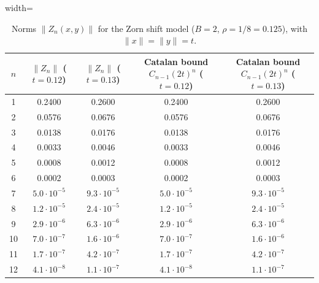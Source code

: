 \documentclass[11pt]{amsart}
\numberwithin{equation}{section}
\theoremstyle{remark}
\begin{document}
\begin{table}[h!]
\centering
\caption{Norms $\|Z_n(x,y)\|$ for the Zorn shift model ($B = 2$, $\rho = 1/8 = 0.125$), with $\|x\| = \|y\| = t$.}
\label{tab:zorn-numerics}
\begin{adjustbox}{width=\textwidth}
\begin{tabular}{c c c c c}
\toprule
$n$ & $\|Z_n\|$ ($t=0.12$) & $\|Z_n\|$ ($t=0.13$) & Catalan bound $C_{n-1}(2t)^n$ ($t=0.12$) & Catalan bound $C_{n-1}(2t)^n$ ($t=0.13$) \\
\midrule
1 & 0.2400 & 0.2600 & 0.2400 & 0.2600 \\
2 & 0.0576 & 0.0676 & 0.0576 & 0.0676 \\
3 & 0.0138 & 0.0176 & 0.0138 & 0.0176 \\
4 & 0.0033 & 0.0046 & 0.0033 & 0.0046 \\
5 & 0.0008 & 0.0012 & 0.0008 & 0.0012 \\
6 & 0.0002 & 0.0003 & 0.0002 & 0.0003 \\
7 & $5.0\cdot10^{-5}$ & $9.3\cdot10^{-5}$ & $5.0\cdot10^{-5}$ & $9.3\cdot10^{-5}$ \\
8 & $1.2\cdot10^{-5}$ & $2.4\cdot10^{-5}$ & $1.2\cdot10^{-5}$ & $2.4\cdot10^{-5}$ \\
9 & $2.9\cdot10^{-6}$ & $6.3\cdot10^{-6}$ & $2.9\cdot10^{-6}$ & $6.3\cdot10^{-6}$ \\
10& $7.0\cdot10^{-7}$ & $1.6\cdot10^{-6}$ & $7.0\cdot10^{-7}$ & $1.6\cdot10^{-6}$ \\
11& $1.7\cdot10^{-7}$ & $4.2\cdot10^{-7}$ & $1.7\cdot10^{-7}$ & $4.2\cdot10^{-7}$ \\
12& $4.1\cdot10^{-8}$ & $1.1\cdot10^{-7}$ & $4.1\cdot10^{-8}$ & $1.1\cdot10^{-7}$ \\
\bottomrule
\end{tabular}\end{adjustbox}
\end{table}
\end{document}
